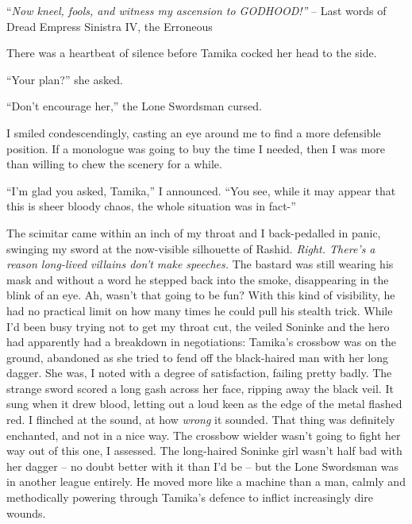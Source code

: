 \documentclass[12pt, openany]{book}
\begin{document}
“\textit{Now kneel, fools, and witness my ascension to GODHOOD!”}
– Last words of Dread Empress Sinistra IV, the Erroneous

There was a heartbeat of silence before Tamika cocked her head to the side.

“Your plan?” she asked.

“Don’t encourage her,” the Lone Swordsman cursed.

I smiled condescendingly, casting an eye around me to find a more defensible position. If a monologue was going to buy the time I needed, then I was more than willing to chew the scenery for a while.

“I’m glad you asked, Tamika,” I announced. “You see, while it may appear that this is sheer bloody chaos, the whole situation was in fact-”

The scimitar came within an inch of my throat and I back-pedalled in panic, swinging my sword at the now-visible silhouette of Rashid. \textit{Right. There’s a reason long-lived villains don’t make speeches.} The bastard was still wearing his mask and without a word he stepped back into the smoke, disappearing in the blink of an eye. Ah, wasn’t that going to be fun? With this kind of visibility, he had no practical limit on how many times he could pull his stealth trick. While I’d been busy trying not to get my throat cut, the veiled Soninke and the hero had apparently had a breakdown in negotiations: Tamika’s crossbow was on the ground, abandoned as she tried to fend off the black-haired man with her long dagger. She was, I noted with a degree of satisfaction, failing pretty badly. The strange sword scored a long gash across her face, ripping away the black veil. It sung\textit{ }when it drew blood, letting out a loud keen as the edge of the metal flashed red. I flinched at the sound, at how \textit{wrong} it sounded. That thing was definitely enchanted, and not in a nice way. The crossbow wielder wasn’t going to fight her way out of this one, I assessed. The long-haired Soninke girl wasn’t half bad with her dagger – no doubt better with it than I’d be – but the Lone Swordsman was in another league entirely. He moved more like a machine than a man, calmly and methodically powering through Tamika’s defence to inflict increasingly dire wounds. 
\end{document}
